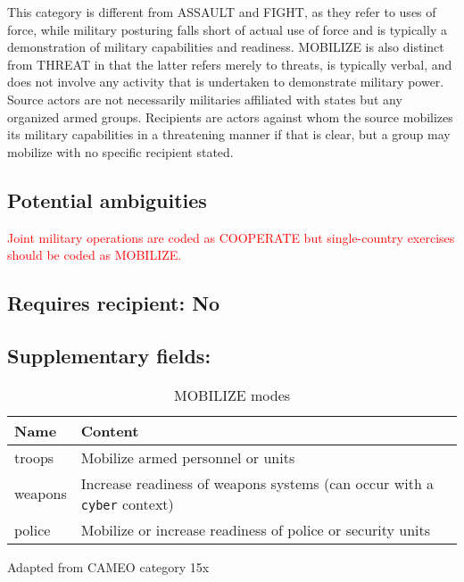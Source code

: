 \documentclass[11pt]{report}
\newcommand{\plcat}[1]{\textsf{#1}}
\newcommand{\txt}[1]{\texttt{#1}}
\newcommand{\andy}[1]{\textcolor{red}{#1}}
\begin{document}
This category is different from \plcat{ASSAULT} and \plcat{FIGHT}, as they refer to uses of force, while military posturing falls short of actual use of force and is typically a demonstration of military capabilities and readiness. \plcat{MOBILIZE} is also distinct from \plcat{THREAT} in that the latter refers merely to threats, is typically verbal, and does not involve any activity that is undertaken to demonstrate military power. Source actors  are not necessarily militaries affiliated with states but any organized armed groups. Recipients are actors against whom the source mobilizes its military capabilities in a threatening manner if that is clear, but a group may mobilize with no specific recipient stated.

\subsection{Potential ambiguities}

\andy{Joint military operations are coded as \plcat{COOPERATE} but single-country exercises should be coded as \plcat{MOBILIZE}.}

\subsection{Requires recipient: No}

\subsection{Supplementary fields: }

\begin{table}[htp]
\caption{MOBILIZE modes}
\begin{center}
\begin{tabular}{|l|p{13cm}|}
\hline
Name & Content \\
\hline
troops & Mobilize armed personnel or units\\
weapons & Increase readiness of weapons systems (can occur with a \txt{cyber} context) \\
police & Mobilize or increase readiness of police or security units\\
\hline
\end{tabular}
\end{center}
\label{tab:mobilizemode}
Adapted from CAMEO category 15x
\end{table}



\newpage  
\end{document}
